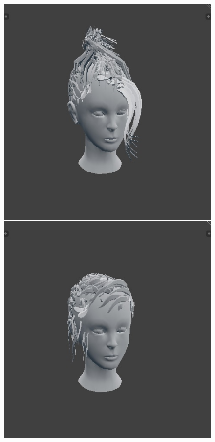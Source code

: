 \documentclass[ %
author={Dillon Keith Diep},
supervisor={Dr. Carl Henrik Ek},
degree={MEng},
title={ART-CG Hair:},
subtitle={Assisted Real-time Content Generation of Stylised Virtual Hair},
type={Research},
year={2017} ]{dissertation}
\begin{document}
\begin{figure}[!h]
	\includegraphics[scale=0.25]{images/outputMesh3}
	\includegraphics[scale=0.25]{images/outputMesh4}\\

\end{figure}
\end{document}
